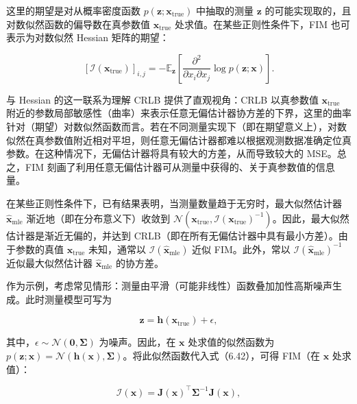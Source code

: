 这里的期望是对从概率密度函数 $p ( \pmb{z}; \pmb{x} _ { \mathrm { true } } )$ 中抽取的测量 $\pmb{z}$ 的可能实现取的，且对数似然函数的偏导数在真参数值 $\pmb { x } _ { \mathrm { true } }$ 处求值。在某些正则性条件下，FIM 也可表示为对数似然 Hessian 矩阵的期望：

\begin{equation}
\left[ \mathcal {I} (\pmb {x} _ {\mathrm{true}}) \right] _ {i, j} = - \mathbb {E} _ {\pmb {z}} \left[ \frac {\partial^ {2}}{\partial x _ {i} \partial x _ {j}} \log p (\pmb {z}; \pmb {x}) \right].\tag{6.43}
\end{equation}

与 Hessian 的这一联系为理解 CRLB 提供了直观视角：CRLB 以真参数值 $\pmb { x } _ { \mathrm { true } }$ 附近的参数局部敏感性（曲率）来表示任意无偏估计器协方差的下界，这里的曲率针对（期望）对数似然函数而言。若在不同测量实现下（即在期望意义上），对数似然在真参数值附近相对平坦，则任意无偏估计器都难以根据观测数据准确定位真参数。在这种情况下，无偏估计器将具有较大的方差，从而导致较大的 MSE。总之，FIM 刻画了利用任意无偏估计器可从测量中获得的、关于真参数值的信息量。

在某些正则性条件下，已有结果表明，当测量数量趋于无穷时，最大似然估计器 $\hat { \pmb x } _ { \mathrm { mle } }$ 渐近地（即在分布意义下）收敛到 $\mathcal { N } \left( \pmb { x } _ { \mathrm { true } } , \mathcal { I } ( \pmb { x } _ { \mathrm { true } } ) ^ { - 1 } \right)$。因此，最大似然估计器是渐近无偏的，并达到 CRLB（即在所有无偏估计器中具有最小方差）。由于参数的真值 $\pmb { x } _ { \mathrm { true } }$ 未知，通常以 $\mathcal { I } ( \hat { \pmb x } _ { \mathrm { mle } } )$ 近似 FIM。此外，常以 $\mathcal { I } ( \hat { \pmb x } _ { \mathrm { mle } } ) ^ { - 1 }$ 近似最大似然估计器 $\hat { \pmb x } _ { \mathrm { mle } }$ 的协方差。

作为示例，考虑常见情形：测量由平滑（可能非线性）函数叠加加性高斯噪声生成。此时测量模型可写为

\begin{equation}
\pmb {z} = \pmb {h} (\pmb {x} _ {\mathrm{true}}) + \epsilon ,\tag{6.44}
\end{equation}

其中，$\epsilon \sim \mathcal { N } ( \mathbf { 0 } , \pmb { \Sigma } )$ 为噪声。因此，在 $\pmb{x}$ 处求值的似然函数为 $p ( \pmb{z} ; \pmb{x} ) = \mathcal { N } ( \pmb{h} ( \pmb{x} ) , \pmb{\Sigma} )$。将此似然函数代入式（6.42），可得 FIM（在 $\pmb{x}$ 处求值）：

\begin{equation}
\mathcal {I} (\pmb {x}) = \mathbf {J} (\pmb {x}) ^ {\top} \pmb {\Sigma} ^ {- 1} \mathbf {J} (\pmb {x}),\tag{6.45}
\end{equation}

